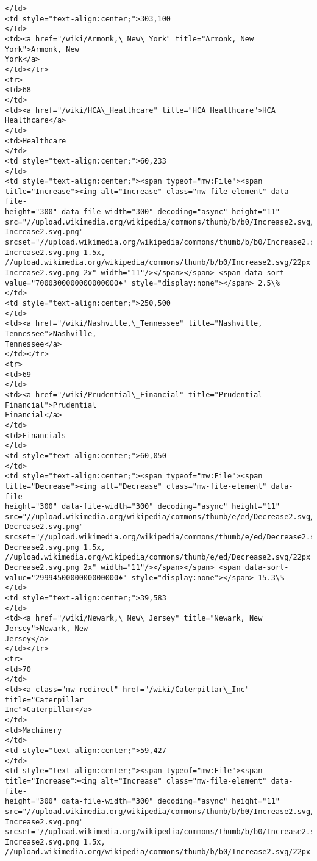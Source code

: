 \documentclass[11pt]{article}
\begin{document}
\begin{Verbatim}[commandchars=\\\{\}]
</td>
<td style="text-align:center;">303,100
</td>
<td><a href="/wiki/Armonk,\_New\_York" title="Armonk, New York">Armonk, New
York</a>
</td></tr>
<tr>
<td>68
</td>
<td><a href="/wiki/HCA\_Healthcare" title="HCA Healthcare">HCA Healthcare</a>
</td>
<td>Healthcare
</td>
<td style="text-align:center;">60,233
</td>
<td style="text-align:center;"><span typeof="mw:File"><span
title="Increase"><img alt="Increase" class="mw-file-element" data-file-
height="300" data-file-width="300" decoding="async" height="11"
src="//upload.wikimedia.org/wikipedia/commons/thumb/b/b0/Increase2.svg/11px-
Increase2.svg.png"
srcset="//upload.wikimedia.org/wikipedia/commons/thumb/b/b0/Increase2.svg/17px-
Increase2.svg.png 1.5x,
//upload.wikimedia.org/wikipedia/commons/thumb/b/b0/Increase2.svg/22px-
Increase2.svg.png 2x" width="11"/></span></span> <span data-sort-
value="7000300000000000000♠" style="display:none"></span> 2.5\%
</td>
<td style="text-align:center;">250,500
</td>
<td><a href="/wiki/Nashville,\_Tennessee" title="Nashville, Tennessee">Nashville,
Tennessee</a>
</td></tr>
<tr>
<td>69
</td>
<td><a href="/wiki/Prudential\_Financial" title="Prudential Financial">Prudential
Financial</a>
</td>
<td>Financials
</td>
<td style="text-align:center;">60,050
</td>
<td style="text-align:center;"><span typeof="mw:File"><span
title="Decrease"><img alt="Decrease" class="mw-file-element" data-file-
height="300" data-file-width="300" decoding="async" height="11"
src="//upload.wikimedia.org/wikipedia/commons/thumb/e/ed/Decrease2.svg/11px-
Decrease2.svg.png"
srcset="//upload.wikimedia.org/wikipedia/commons/thumb/e/ed/Decrease2.svg/17px-
Decrease2.svg.png 1.5x,
//upload.wikimedia.org/wikipedia/commons/thumb/e/ed/Decrease2.svg/22px-
Decrease2.svg.png 2x" width="11"/></span></span> <span data-sort-
value="2999450000000000000♠" style="display:none"></span> 15.3\%
</td>
<td style="text-align:center;">39,583
</td>
<td><a href="/wiki/Newark,\_New\_Jersey" title="Newark, New Jersey">Newark, New
Jersey</a>
</td></tr>
<tr>
<td>70
</td>
<td><a class="mw-redirect" href="/wiki/Caterpillar\_Inc" title="Caterpillar
Inc">Caterpillar</a>
</td>
<td>Machinery
</td>
<td style="text-align:center;">59,427
</td>
<td style="text-align:center;"><span typeof="mw:File"><span
title="Increase"><img alt="Increase" class="mw-file-element" data-file-
height="300" data-file-width="300" decoding="async" height="11"
src="//upload.wikimedia.org/wikipedia/commons/thumb/b/b0/Increase2.svg/11px-
Increase2.svg.png"
srcset="//upload.wikimedia.org/wikipedia/commons/thumb/b/b0/Increase2.svg/17px-
Increase2.svg.png 1.5x,
//upload.wikimedia.org/wikipedia/commons/thumb/b/b0/Increase2.svg/22px-

\end{Verbatim}
\end{document}
